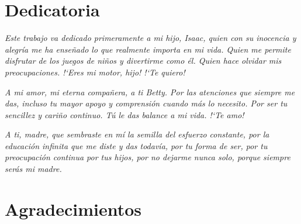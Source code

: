 \chapter*{Dedicatoria}

\vfill

\hfill \begin{minipage}[c]{0.7\linewidth}
\textit{Este trabajo va dedicado primeramente a mi hijo, Isaac, quien con su inocencia y alegr\'ia me ha ense\~nado lo que realmente importa en mi vida. Quien me permite disfrutar de los juegos de ni\~nos y divertirme como \'el. Quien hace olvidar mis preocupaciones. !`Eres mi motor, hijo! !`Te quiero!}

\vspace{1.5cm}

\textit{A mi amor, mi eterna compa\~nera, a ti Betty. Por las atenciones que siempre me das, incluso tu mayor apoyo y comprensi\'on cuando m\'as lo necesito. Por ser tu sencillez y cari\~no continuo. T\'u le das balance a mi vida. !`Te amo!}


\vspace{1.5cm}

\textit{A ti, madre, que sembraste en m\'i la semilla del esfuerzo constante, por la educaci\'on infinita que me diste y das todav\'ia, por tu forma de ser, por tu preocupaci\'on continua por tus hijos, por no dejarme nunca solo, porque siempre ser\'as mi madre.}
\end{minipage}

\vfill


\chapter*{Agradecimientos}

\vfill

